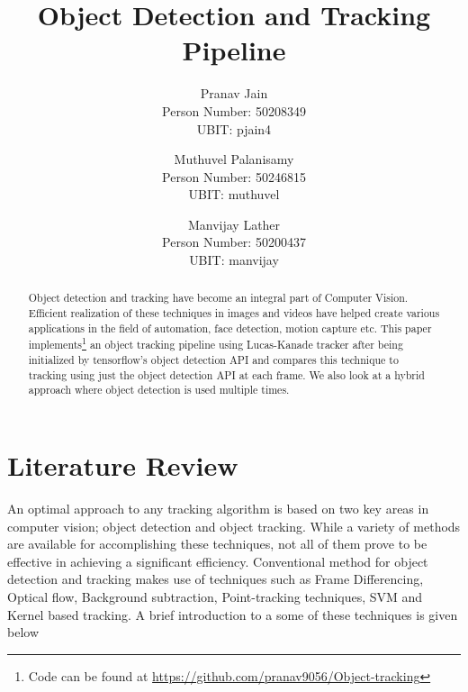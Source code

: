 \documentclass[10pt,twocolumn,letterpaper]{article}
\begin{document}
\title{Object Detection and Tracking Pipeline}

\author{Pranav Jain\\
Person Number: 50208349\\
UBIT: pjain4\\
\and
Muthuvel Palanisamy	\\
Person Number: 50246815\\
UBIT: muthuvel\\
\and
Manvijay Lather	\\
Person Number: 50200437\\
UBIT: manvijay\\
}

\maketitle

\begin{abstract}
   Object detection and tracking have become an integral part of Computer Vision. Efficient realization of these techniques in images and videos have helped create various applications in the field of automation, face detection, motion capture etc. This paper implements\footnote{Code can be found at \url{https://github.com/pranav9056/Object-tracking}} an object tracking pipeline using Lucas-Kanade tracker after being initialized by tensorflow's object detection API and compares this technique to tracking using just the object detection API at each frame. We also look at a hybrid approach where object detection is used multiple times. 
   \end{abstract} 
\section{Literature Review}

An optimal approach to any tracking algorithm is based on two key areas in computer vision; object detection and object tracking. While a variety of methods are available for accomplishing these techniques, not all of them prove to be effective in achieving a significant efficiency. Conventional method for object detection and tracking makes use of techniques such as Frame Differencing, Optical flow, Background subtraction, Point-tracking techniques, SVM and Kernel based tracking. A brief introduction to a some of these techniques is given below
\end{document}
